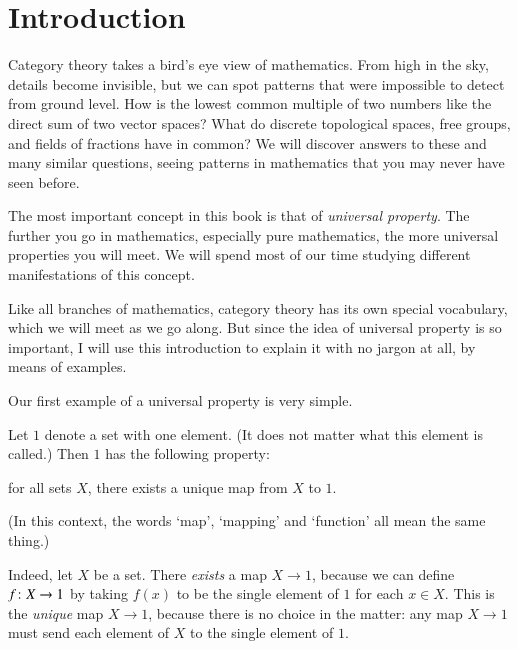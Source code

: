 %
%
%

\chapter*{Introduction}
\label{ch:intro}

Category theory takes a bird's eye view of mathematics.  From high in the sky,
details become invisible, but we can spot patterns that were impossible to
detect from ground level.  How is the lowest common multiple of two numbers
like the direct sum of two vector spaces?  What do discrete topological
spaces, free groups, and fields of fractions have in common?  We will
discover answers to these and many similar questions, seeing patterns in
mathematics that you may never have seen before.

The most important concept in this book is that of \emph{universal%
%
%
property}.  The further you go in mathematics, especially pure mathematics,
the more universal properties you will meet.  We will spend most of our
time studying different manifestations of this concept.

Like all branches of mathematics, category theory has its own special
vocabulary, which we will meet as we go along.  But since the idea of
universal property is so important, I will use this introduction to explain
it with no jargon at all, by means of examples.

Our first example of a universal property is very simple.

\begin{iexample}
\label{eg:univ-terminal-set}
Let $1$%
%
%
denote a set with one%
%
%
element.  (It does not matter what this element is called.)  Then $1$ has
the following property:
%
\begin{displaytext}
for all sets $X$, there exists a unique map from $X$ to $1$.
\end{displaytext}
%
(In this context, the words `map', `mapping' and `function' all mean the
same thing.)

Indeed, let $X$ be a set.  There \emph{exists} a map $X \to 1$, because we
can define $f\from X \to 1$ by taking $f(x)$ to be the single element of
$1$ for each $x \in X$.  This is the \emph{unique} map $X \to 1$, because
there is no choice in the matter: any map $X \to 1$ must send each element
of $X$ to the single element of $1$.
\end{iexample}

